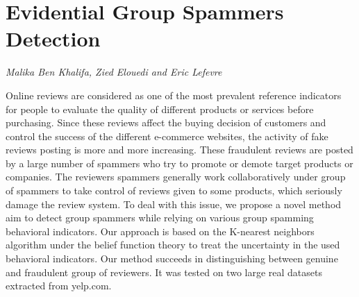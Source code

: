 \documentclass[../booklet.tex]{subfiles}
\begin{document}
\section[Evidential Group Spammers Detection. {\it Malika Ben Khalifa, Zied Elouedi and Eric Lefevre}]{Evidential Group Spammers Detection}
  

\begin{center}
  {\it Malika Ben Khalifa, Zied Elouedi and Eric Lefevre}
\end{center}

\vskip 0.8cm


\emph{}
Online reviews are considered as one of the most prevalent reference indicators for people to evaluate the quality of different products or services before purchasing. Since these reviews affect the buying decision of customers and control the success of the different e-commerce websites, the activity of fake reviews posting is more and more increasing. These fraudulent reviews are posted by a large number of spammers who try to promote or demote target products or companies. The reviewers spammers generally work collaboratively under group of spammers to take control of reviews given to some products, which seriously damage the review system. To deal with this issue, we propose a novel method aim to detect group spammers while relying on various group spamming behavioral indicators. Our approach is based on the K-nearest neighbors algorithm under the belief function theory to treat the uncertainty in the used behavioral indicators. Our method succeeds in distinguishing between genuine and fraudulent group of reviewers. It was tested on two large real datasets extracted from yelp.com.

\end{document}
